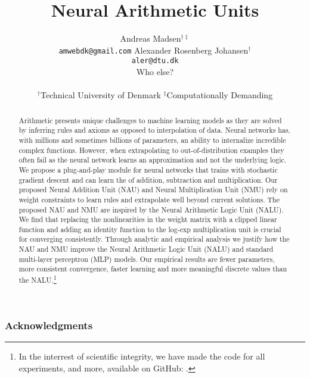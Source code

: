 \documentclass{article}
\title{Neural Arithmetic Units}
\author{%
  Andreas Madsen$^{\dag\ddag}$ \\
  \texttt{amwebdk@gmail.com}
  \AND
  Alexander Rosenberg Johansen$^{\dag}$ \\
  \texttt{aler@dtu.dk} \\
  \AND
  Who else? \\
  \\
$^\dag$Technical University of Denmark \quad
$^\ddag$Computationally Demanding
}
\begin{document}
\StopCensoring %

\maketitle

\begin{abstract}
Arithmetic presents unique challenges to machine learning models as they are solved by inferring rules and axioms as opposed to interpolation of data.
Neural networks has, with millions and sometimes billions of parameters, an ability to internalize incredible complex functions.
However, when extrapolating to out-of-distribution examples they often fail as the neural network learns an approximation and not the underlying logic.
We propose a plug-and-play module for neural networks that trains with stochastic gradient descent and can learn the of addition, subtraction and multiplication.
Our proposed Neural Addition Unit (NAU) and Neural Multiplication Unit (NMU) rely on weight constraints to learn rules and extrapolate well beyond current solutions.
The proposed NAU and NMU are inspired by the Neural Arithmetic Logic Unit (NALU).
We find that replacing the nonlinearities in the weight matrix with a clipped linear function and adding an identity function to the log-exp multiplication unit is crucial for converging consistently.
Through analytic and empirical analysis we justify how the NAU and NMU improve the Neural Arithmetic Logic Unit (NALU) and standard multi-layer perceptron (MLP) models.
Our empirical results are fewer parameters, more consistent convergence, faster learning and more meaningful discrete values than the NALU.\footnote{In the interrest of scientific integrity, we have made the code for all experiments, and more, available on GitHub: . }
\end{abstract}






\subsubsection*{Acknowledgments}




\end{document}
